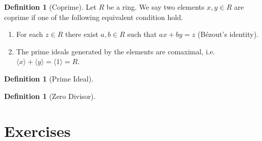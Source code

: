 \documentclass{book}
\theoremstyle{plain}
\theoremstyle{definition}
\theoremstyle{custom_definition}
\newtheorem{defn}[thm]{Definition}
\begin{document}
\begin{defn}[Coprime]
  Let \(R\) be a ring. We say two elements \(x, y \in R\) are coprime if one of the following equivalent condition hold.
  \begin{enumerate}
    \item For each \(z \in R\) there exist \(a, b \in R\) such that \(ax + by = z\) (Bézout's identity).
    \item The prime ideals generated by the elements are comaximal, i.e. \(\langle x \rangle + \langle y \rangle = \langle 1 \rangle = R\).
  \end{enumerate}
\end{defn}

\begin{defn}[Prime Ideal]
\end{defn}

\begin{defn}[Zero Divisor]
\end{defn}

\part{Exercises}
\end{document}
